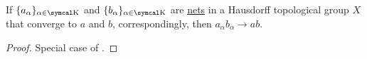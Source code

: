 \begin{Proposition}\label{thm:limits_are_topological_group_homomorphisms}
  If \( \{ a_\alpha \}_{\alpha \in \CK} \) and \( \{ b_\alpha \}_{\alpha \in \CK} \) are \hyperref[def:topological_net]{nets} in a Hausdorff topological group \( X \) that converge to \( a \) and \( b \), correspondingly, then \( a_\alpha b_\alpha \to a b \).
\end{Proposition}
\begin{proof}
  Special case of .
\end{proof}
